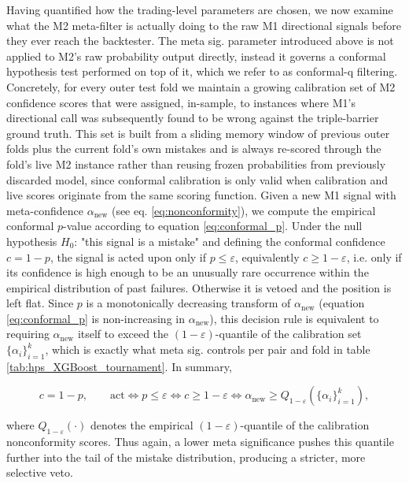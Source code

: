 \documentclass[12pt, a4paper]{article}
\begin{document}
Having quantified how the trading-level parameters are chosen, we now examine what the M2 meta-filter is actually doing to the raw M1 directional signals before 
they ever reach the backtester. The meta sig. parameter introduced above is not applied to M2's raw probability output directly, instead it governs a conformal 
hypothesis test performed on top of it, which we refer to as conformal-q filtering. Concretely, for every outer test fold we maintain a growing calibration set 
of M2 confidence scores that were assigned, in-sample, to instances where M1's directional call was subsequently found to be wrong against the triple-barrier ground truth. 
This set is built from a sliding memory window of previous outer folds plus the current fold's own mistakes and is always 
re-scored through the fold's live M2 instance rather than reusing frozen probabilities from previously discarded model, since conformal calibration is only valid when calibration 
and live scores originate from the same scoring function. Given a new M1 signal with meta-confidence $\alpha_{\text{new}}$ (see eq. \ref{eq:nonconformity}), we compute the empirical 
conformal $p$-value according to equation \ref{eq:conformal_p}. Under the null hypothesis $H_0$: "this signal is a mistake" and defining the conformal confidence 
$c = 1 - p$, the signal is acted upon only if $p \leq \varepsilon$, equivalently $c \geq 1 - \varepsilon$, 
i.e. only if its confidence is high enough to be an unusually rare occurrence within the empirical distribution of past failures. 
Otherwise it is vetoed and the position is left flat. Since $p$ is a monotonically decreasing transform of $\alpha_{\text{new}}$ (equation \ref{eq:conformal_p} is non-increasing 
in $\alpha_{\text{new}}$), this decision rule is equivalent to requiring $\alpha_{\text{new}}$ itself to exceed the $(1-\varepsilon)$-quantile of the calibration set 
$\{\alpha_i\}_{i=1}^{k}$, which is exactly what meta sig. controls per pair and fold in table \ref{tab:hps_XGBoost_tournament}. In summary,

\begin{equation}
c = 1 - p, \qquad \text{act} \iff p \leq \varepsilon \iff c \geq 1-\varepsilon \iff \alpha_{\text{new}} \geq Q_{1-\varepsilon}\left(\{\alpha_i\}_{i=1}^k\right),
\end{equation}

where $Q_{1-\varepsilon}(\cdot)$ denotes the empirical $(1-\varepsilon)$-quantile of the calibration nonconformity scores. Thus again, a lower meta significance pushes 
this quantile further into the tail of the mistake distribution, producing a stricter, more selective veto.
\end{document}
